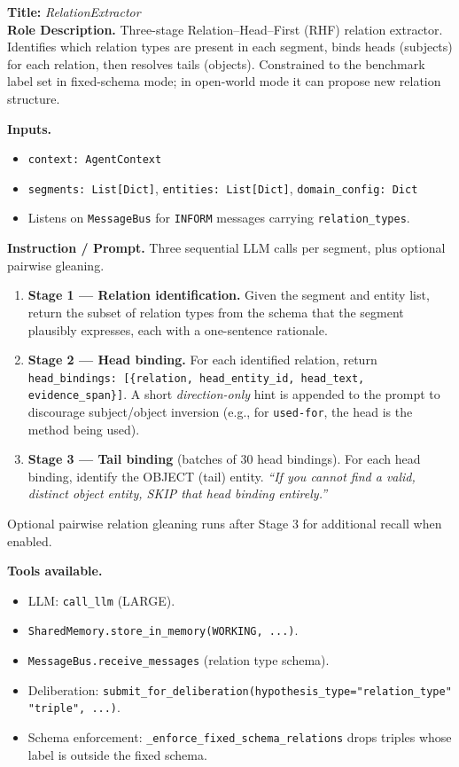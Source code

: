 \documentclass{article}
\begin{document}
\begin{agentbox}
\textbf{Title:} \textit{RelationExtractor}\\
\textbf{Role Description.} Three-stage Relation--Head--First (RHF)
relation extractor. Identifies which relation types are present in
each segment, binds heads (subjects) for each relation, then resolves
tails (objects). Constrained to the benchmark label set in
fixed-schema mode; in open-world mode it can propose new relation
structure.

\textbf{Inputs.}
\begin{itemize}[leftmargin=*,nosep]
\item \texttt{context: AgentContext}
\item \texttt{segments: List[Dict]}, \texttt{entities: List[Dict]}, \texttt{domain\_config: Dict}
\item Listens on \texttt{MessageBus} for \texttt{INFORM} messages carrying \texttt{relation\_types}.
\end{itemize}

\textbf{Instruction / Prompt.} Three sequential LLM calls per segment, plus optional pairwise gleaning.
\begin{enumerate}[leftmargin=*,nosep]
\item \textbf{Stage 1 --- Relation identification.} Given the segment and entity list, return the subset of relation types from the schema that the segment plausibly expresses, each with a one-sentence rationale.
\item \textbf{Stage 2 --- Head binding.} For each identified relation, return \texttt{head\_bindings: [\{relation, head\_entity\_id, head\_text, evidence\_span\}]}. A short \emph{direction-only} hint is appended to the prompt to discourage subject/object inversion (e.g., for \texttt{used-for}, the head is the method being used).
\item \textbf{Stage 3 --- Tail binding} (batches of 30 head bindings). For each head binding, identify the OBJECT (tail) entity. \textit{``If you cannot find a valid, distinct object entity, SKIP that head binding entirely.''}
\end{enumerate}
Optional pairwise relation gleaning runs after Stage 3 for additional recall when enabled.

\textbf{Tools available.}
\begin{itemize}[leftmargin=*,nosep]
\item LLM: \texttt{call\_llm} (LARGE).
\item \texttt{SharedMemory.store\_in\_memory(WORKING, ...)}.
\item \texttt{MessageBus.receive\_messages} (relation type schema).
\item Deliberation: \texttt{submit\_for\_deliberation(hypothesis\_type="relation\_type" \textbar{} "triple", ...)}.
\item Schema enforcement: \texttt{\_enforce\_fixed\_schema\_relations} drops triples whose label is outside the fixed schema.
\end{itemize}


\end{agentbox}
\end{document}
